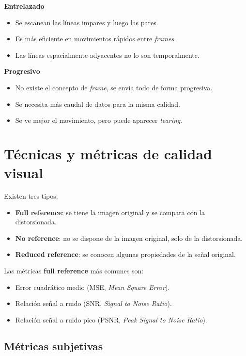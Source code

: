 \documentclass[11pt,a4paper]{article}
\begin{document}
\textbf{Entrelazado}
\begin{itemize}
    \item Se escanean las líneas impares y luego las pares.
    \item Es más eficiente en movimientos rápidos entre \textit{frames}.
    \item Las líneas espacialmente adyacentes no lo son temporalmente.
\end{itemize}

\textbf{Progresivo}
\begin{itemize}
    \item No existe el concepto de \textit{frame}, se envía todo de forma progresiva.
    \item Se necesita más caudal de datos para la misma calidad.
    \item Se ve mejor el movimiento, pero puede aparecer \textit{tearing}.
\end{itemize}

\section{Técnicas y métricas de calidad visual}

Existen tres tipos:
\begin{itemize}
    \item \textbf{Full reference}: se tiene la imagen original y se compara con la distorsionada.
    \item \textbf{No reference}: no se dispone de la imagen original, solo de la distorsionada.
    \item \textbf{Reduced reference}: se conocen algunas propiedades de la señal original.
\end{itemize}

Las métricas \textbf{full reference} más comunes son:
\begin{itemize}
    \item Error cuadrático medio (MSE, \textit{Mean Square Error}).
    \item Relación señal a ruido (SNR, \textit{Signal to Noise Ratio}).
    \item Relación señal a ruido pico (PSNR, \textit{Peak Signal to Noise Ratio}).
\end{itemize}

\subsection{Métricas subjetivas}
\end{document}
